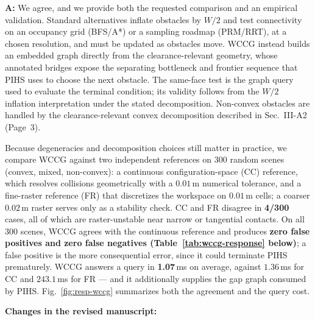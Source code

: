 \documentclass[11pt]{article}
\begin{document}
\noindent \textbf{A:}
We agree, and we provide both the requested comparison and an empirical
validation. Standard alternatives inflate obstacles by $W/2$ and test connectivity on an occupancy grid
(BFS/A*) or a sampling roadmap (PRM/RRT), at a chosen resolution, and must be updated as
obstacles move.
WCCG instead builds an embedded graph directly from the clearance-relevant geometry, whose
annotated bridges expose the separating bottleneck and frontier sequence that PIHS uses to choose
the next obstacle. The same-face test is the graph query used to evaluate
the terminal condition; its validity follows from the $W/2$ inflation
interpretation under the stated decomposition. Non-convex obstacles are handled
by the clearance-relevant convex decomposition described in Sec.~III-A2
(Page~3).

Because degeneracies and decomposition choices still matter in practice, we compare WCCG against
two independent references on 300 random scenes (convex, mixed, non-convex): a continuous
configuration-space (CC) reference, which resolves collisions geometrically with a
$0.01$\,m numerical tolerance, and a fine-raster reference (FR) that discretizes
the workspace on $0.01$\,m cells; a coarser $0.02$\,m raster serves only as a
stability check.
CC and FR disagree in \textbf{4/300} cases, all of which are raster-unstable
near narrow or tangential contacts. On all 300 scenes, WCCG agrees with the
continuous reference and produces \textbf{zero false positives and zero false
negatives (Table~\ref{tab:wccg-response} below)}; a false positive is the more consequential error, since it could terminate PIHS
prematurely. WCCG answers a query in \textbf{1.07}\,ms on
average, against $1.36$\,ms for CC and $243.1$\,ms for FR --- and it additionally supplies the gap graph consumed by PIHS.
Fig.~\ref{fig:resp-wccg} summarizes both the agreement and the query cost.

\noindent\textbf{Changes in the revised manuscript:}
\end{document}
